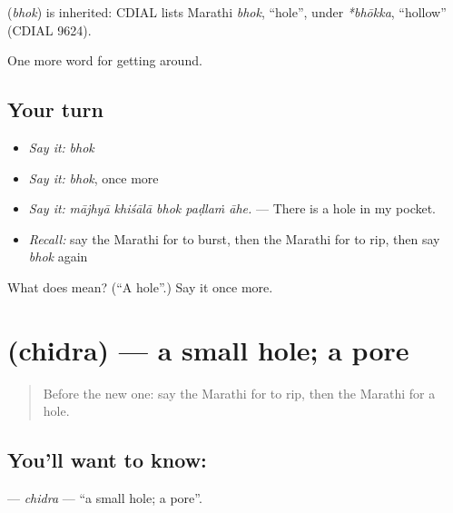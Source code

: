 \begin{cousinweb}
\textbf{} (\emph{bhok}) is inherited: CDIAL lists Marathi \emph{bhok}, \textquotedblleft{}hole\textquotedblright{}, under \emph{*bhōkka}, \textquotedblleft{}hollow\textquotedblright{} (CDIAL 9624).
\end{cousinweb}

\begin{grammarlens}[title={What you've built}]
One more word for getting around.
\end{grammarlens}

\subsection*{Your turn}
\begin{itemize}
\raggedright
  \item \emph{Say it:} \emph{bhok}
  \item \emph{Say it:} \emph{bhok}, once more
  \item \emph{Say it:} \emph{mājhyā khiśālā bhok paḍlaṁ āhe.} — There is a hole in my pocket.
  \item \emph{Recall:} say the Marathi for to burst, then the Marathi for to rip, then say \emph{bhok} again
\end{itemize}

\begin{tcolorbox}[breakable,colback=teal!4,colframe=teal!35!black,title={Before you move on}]
What does  mean? (\textquotedblleft{}A hole\textquotedblright{}.) Say it once more.
\end{tcolorbox}
\section[\texorpdfstring{\mr{छिद्र} (chidra)}{छिद्र (chidra)}]{ (chidra) — a small hole; a pore}

\label{lesson:MR-C432-chidra}



\begin{quote}
Before the new one: say the Marathi for to rip, then the Marathi for a hole.
\end{quote}

\subsection*{You'll want to know: }
\textbf{} — \emph{chidra} — \textquotedblleft{}a small hole; a pore\textquotedblright{}.

